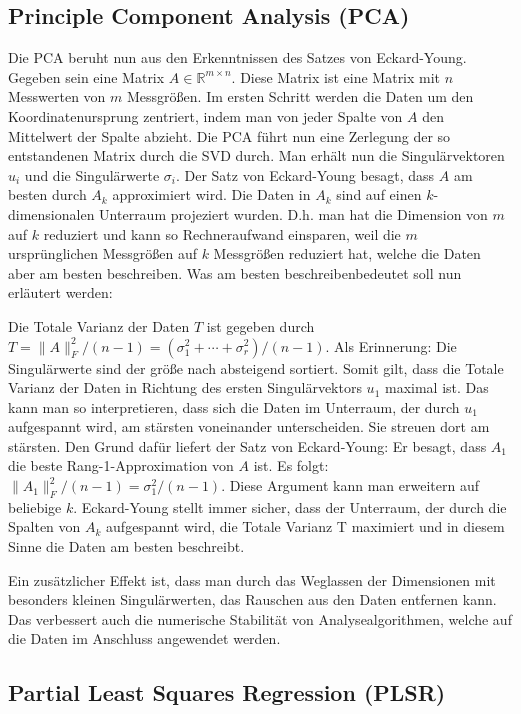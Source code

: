 \documentclass{article}
\newcommand{\R}[0]{\mathbb{R}}
\begin{document}
\subsection{Principle Component Analysis (PCA)}

Die PCA beruht nun aus den Erkenntnissen des Satzes von Eckard-Young. Gegeben sein eine Matrix $A \in \R^{m\times n}$. 
Diese Matrix ist eine Matrix mit $n$ Messwerten von $m$ Messgrößen.
Im ersten Schritt werden die Daten um den Koordinatenursprung zentriert, indem man von jeder Spalte von $A$ den Mittelwert der Spalte abzieht.
Die PCA führt nun eine Zerlegung der so entstandenen Matrix durch die SVD durch. 
Man erhält nun die Singulärvektoren $u_i$ und die Singulärwerte $\sigma_i$.
Der Satz von Eckard-Young besagt, dass $A$ am besten durch $A_k$ approximiert wird.
Die Daten in $A_k$ sind auf einen $k$-dimensionalen Unterraum projeziert wurden. 
D.h. man hat die Dimension von $m$ auf $k$ reduziert und kann so Rechneraufwand einsparen, 
weil die $m$ ursprünglichen Messgrößen auf $k$ Messgrößen reduziert hat, welche die Daten aber am besten beschreiben.
Was \glqq am besten beschreiben\dq \space bedeutet soll nun erläutert werden:

Die Totale Varianz der Daten $T$ ist gegeben durch $T = \lVert A \rVert_F^2 / (n-1) = (\sigma_1^2 + \cdots + \sigma_r^2) / (n-1)$.
Als Erinnerung: Die Singulärwerte sind der größe nach absteigend sortiert. Somit gilt, dass die Totale Varianz der Daten in Richtung des ersten Singulärvektors $u_1$ maximal ist.
Das kann man so interpretieren, dass sich die Daten im Unterraum, der durch $u_1$ aufgespannt wird, am stärsten voneinander unterscheiden. Sie streuen dort am stärsten.
Den Grund dafür liefert der Satz von Eckard-Young: Er besagt, dass $A_1$ die beste Rang-1-Approximation von $A$ ist. Es folgt: $\lVert A_1 \rVert_F^2 / (n-1) = \sigma_1^2 / (n-1)$.
Diese Argument kann man erweitern auf beliebige $k$. Eckard-Young stellt immer sicher, dass der Unterraum, der durch die Spalten von $A_k$ aufgespannt wird, die Totale Varianz T maximiert 
und in diesem Sinne die Daten am besten beschreibt.

Ein zusätzlicher Effekt ist, dass man durch das Weglassen der Dimensionen mit besonders kleinen Singulärwerten, das Rauschen aus den Daten entfernen kann. 
Das verbessert auch die numerische Stabilität von Analysealgorithmen, welche auf die Daten im Anschluss angewendet werden. 

\subsection{Partial Least Squares Regression (PLSR)}
\end{document}

